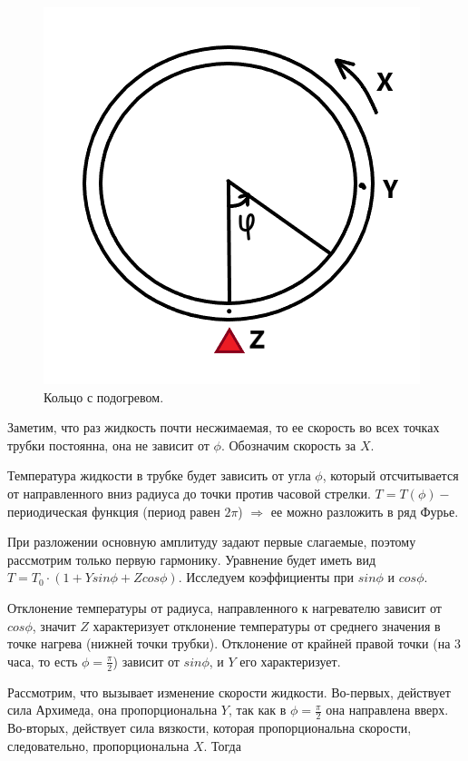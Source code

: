 \documentclass[12pt]{article}
\begin{document}
\begin{figure}[h]
	\centering
 	\includegraphics[scale=0.5]{Lorenz.png}
 	\caption{Кольцо с подогревом.}
  	\label{fig:boat1}
\end{figure}

Заметим, что раз жидкость почти несжимаемая, то ее скорость во всех точках трубки постоянна, она не зависит от $\phi$. Обозначим скорость за $X$.

Температура жидкости в трубке будет зависить от угла $\phi$, который отсчитывается от направленного вниз радиуса до точки против часовой стрелки. $T = T(\phi) -$ периодическая функция (период равен $2\pi$) $\Rightarrow$ ее можно разложить в ряд Фурье.

При разложении основную амплитуду задают первые слагаемые, поэтому рассмотрим только первую гармонику. Уравнение будет иметь вид $T = T_0 \cdot (1+Ysin\phi + Zcos\phi)$. Исследуем коэффициенты при $sin\phi$ и $cos\phi$.

Отклонение температуры от радиуса, направленного к нагревателю зависит от $cos \phi$, значит $Z$ характеризует отклонение температуры от среднего значения в точке нагрева (нижней точки трубки). Отклонение от крайней правой точки (на 3 часа, то есть $\phi = \frac{\pi}{2}$) зависит от $sin\phi$, и $Y$ его характеризует.

Рассмотрим, что вызывает изменение скорости жидкости. Во-первых, действует сила Архимеда, она пропорциональна $Y$, так как в $\phi=\frac{\pi}{2}$ она направлена вверх. Во-вторых, действует сила вязкости, которая пропорциональна скорости, следовательно, пропорциональна $X$. Тогда
\end{document}
